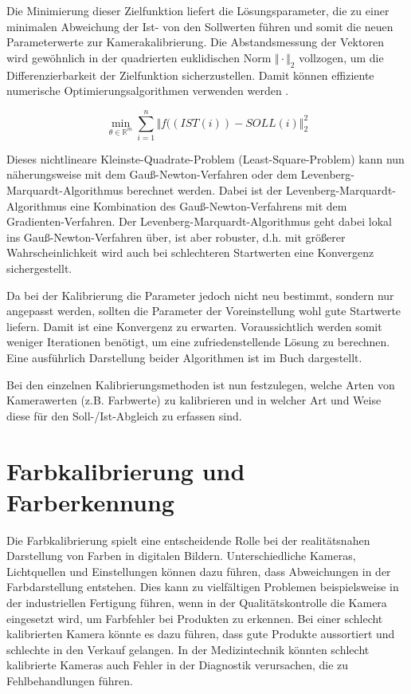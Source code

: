 {Die Minimierung dieser Zielfunktion liefert die Lösungsparameter, 
die zu einer minimalen Abweichung der Ist- von den Sollwerten führen und somit die neuen Parameterwerte zur Kamerakalibrierung. 
Die Abstandsmessung der Vektoren wird gewöhnlich in der quadrierten euklidischen Norm 
$\Vert \cdot \Vert_2$ vollzogen, um die Differenzierbarkeit der Zielfunktion sicherzustellen. 
Damit können effiziente numerische Optimierungsalgorithmen verwenden werden \cite{Dennis:1983}.

\[
\min_{\theta\in \mathbb{R}^m}  \sum_{i=1}^n \Vert f( (IST (i)) - SOLL (i) \Vert_2^2
\]

Dieses nichtlineare Kleinste-Quadrate-Problem (Least-Square-Problem) 
kann nun näherungsweise mit dem Gauß-Newton-Verfahren oder dem Levenberg-Marquardt-Algorithmus berechnet werden. 
Dabei ist der \linebreak 
Levenberg-Marquardt-Algorithmus eine Kombination des Gauß-Newton-Verfahrens 
mit dem Gradienten-Verfahren. Der Levenberg-Marquardt-Algorithmus geht dabei lokal ins Gauß-Newton-Verfahren über, 
ist aber robuster, d.h. mit größerer Wahrscheinlichkeit wird auch bei schlechteren Startwerten eine Konvergenz sichergestellt. 

Da bei der Kalibrierung die Parameter jedoch nicht neu bestimmt, 
sondern nur angepasst werden, sollten die Parameter der Voreinstellung 
wohl gute Startwerte liefern. Damit ist eine Konvergenz zu erwarten. 
Voraussichtlich werden somit weniger Iterationen benötigt, 
um eine zufriedenstellende Lösung zu berechnen. 
Eine ausführlich Darstellung beider Algorithmen ist im Buch \cite{Dennis:1983} dargestellt.

Bei den einzelnen Kalibrierungsmethoden ist nun festzulegen, 
welche Arten von Kamerawerten (z.B. Farbwerte) zu kalibrieren  
und in welcher Art und Weise diese für den Soll-/Ist-Abgleich zu erfassen sind.



\chapter{Farbkalibrierung und Farberkennung}

Die Farbkalibrierung spielt eine entscheidende Rolle bei der realitätsnahen 
Darstellung von Farben in digitalen Bildern. Unterschiedliche Kameras, Lichtquellen 
und Einstellungen können dazu führen, dass Abweichungen in der Farbdarstellung entstehen. 
Dies kann zu vielfältigen Problemen beispielsweise in der industriellen Fertigung führen,
wenn in der Qualitäts\-kontrolle die Kamera eingesetzt wird, um Farbfehler bei Produkten zu erkennen.
Bei einer schlecht kalibrierten Kamera könnte es dazu 
führen, dass gute Produkte aussortiert und schlechte in den Verkauf gelangen.  
In der Medizintechnik könnten schlecht kalibrierte Kameras auch Fehler in der Diagnostik verursachen,
die zu Fehlbehandlungen führen.

}
